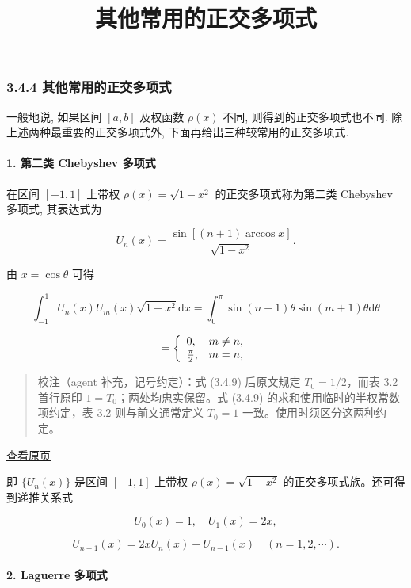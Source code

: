\documentclass[
  10pt,
  fontset=fandol]{ctexart}
\title{其他常用的正交多项式}
\author{}
\date{}
\begin{document}
\maketitle

\subsubsection{3.4.4 其他常用的正交多项式}\label{ux5176ux4ed6ux5e38ux7528ux7684ux6b63ux4ea4ux591aux9879ux5f0f}

一般地说, 如果区间 \([a,b]\) 及权函数 \(\rho(x)\) 不同, 则得到的正交多项式也不同. 除上述两种最重要的正交多项式外, 下面再给出三种较常用的正交多项式.

\paragraph{1. 第二类 Chebyshev 多项式}\label{ux7b2cux4e8cux7c7b-chebyshev-ux591aux9879ux5f0f}

在区间 \([-1,1]\) 上带权 \(\rho(x) = \sqrt{1-x^2}\) 的正交多项式称为第二类 Chebyshev 多项式, 其表达式为

\[
U_n(x) = \frac{\sin[(n+1)\arccos x]}{\sqrt{1-x^2}}. \tag{3.4.10}
\]

由 \(x=\cos\theta\) 可得

\[
\int_{-1}^{1} U_n(x) U_m(x) \sqrt{1-x^2} \mathrm{d}x = \int_{0}^{\pi} \sin(n+1)\theta \sin(m+1)\theta \mathrm{d}\theta
\]

\[
= \left\{ \begin{array}{l l} 0, & m \neq n, \\ \frac{\pi}{2}, & m=n, \end{array} \right.
\]

\begin{quote}
校注（agent 补充，记号约定）：式 (3.4.9) 后原文规定 \(T_0=1/2\)，而表 3.2 首行原印 \(1=T_0\)；两处均忠实保留。式 (3.4.9) 的求和使用临时的半权常数项约定，表 3.2 则与前文通常定义 \(T_0=1\) 一致。使用时须区分这两种约定。
\end{quote}

\href{../../source-images/pdf-076.jpeg}{查看原页}

即 \(\{U_n(x)\}\) 是区间 \([-1,1]\) 上带权 \(\rho(x)=\sqrt{1-x^2}\) 的正交多项式族。还可得到递推关系式

\[
U_0(x)=1,\quad U_1(x)=2x,
\]

\[
U_{n+1}(x)=2xU_n(x)-U_{n-1}(x)\quad(n=1,2,\cdots).
\]

\paragraph{2. Laguerre 多项式}\label{laguerre-ux591aux9879ux5f0f}
\end{document}
